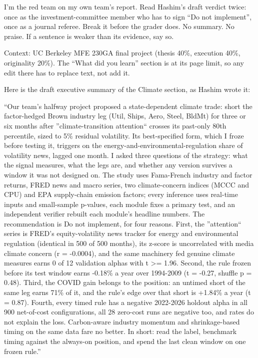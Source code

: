 \par\noindent I'm the red team on my own team's report. Read Hashim's draft verdict twice: once as the investment-committee member who has to sign ``Do not implement'', once as a journal referee. Break it before the grader does. No summary. No praise. If a sentence is weaker than its evidence, say so.
\medskip
\par\noindent Context: UC Berkeley MFE 230GA final project (thesis 40\%, execution 40\%, originality 20\%). The ``What did you learn'' section is at its page limit, so any edit there has to replace text, not add it.
\medskip
\par\noindent Here is the draft executive summary of the Climate section, as Hashim wrote it:
\medskip
\par\noindent ``Our team's halfway project proposed a state-dependent climate trade: short the factor-hedged Brown industry leg (Util, Ships, Aero, Steel, BldMt) for three or six months after ''climate-transition attention`` crosses its past-only 80th percentile, sized to 5\% residual volatility. Its best-specified form, which I froze before testing it, triggers on the energy-and-environmental-regulation share of volatility news, lagged one month. I asked three questions of the strategy: what the signal measures, what the legs are, and whether any version survives a window it was not designed on. The study uses Fama-French industry and factor returns, FRED news and macro series, two climate-concern indices (MCCC and CPU) and EPA supply-chain emission factors; every inference uses real-time inputs and small-sample p-values, each module fixes a primary test, and an independent verifier rebuilt each module's headline numbers. The recommendation is Do not implement, for four reasons. First, the ''attention`` series is FRED's equity-volatility news tracker for energy and environmental regulation (identical in 500 of 500 months), its z-score is uncorrelated with media climate concern (r = -0.0004), and the same machinery fed genuine climate measures earns 0 of 12 validation alphas with t \textgreater{}= 1.96. Second, the rule frozen before its test window earns -0.18\% a year over 1994-2009 (t = -0.27, shuffle p = 0.48). Third, the COVID gain belongs to the position: an untimed short of the same leg earns 71\% of it, and the rule's edge over that short is +1.84\% a year (t = 0.87). Fourth, every timed rule has a negative 2022-2026 holdout alpha in all 900 net-of-cost configurations, all 28 zero-cost runs are negative too, and rates do not explain the loss. Carbon-aware industry momentum and shrinkage-based timing on the same data fare no better. In short: read the label, benchmark timing against the always-on position, and spend the last clean window on one frozen rule.''
